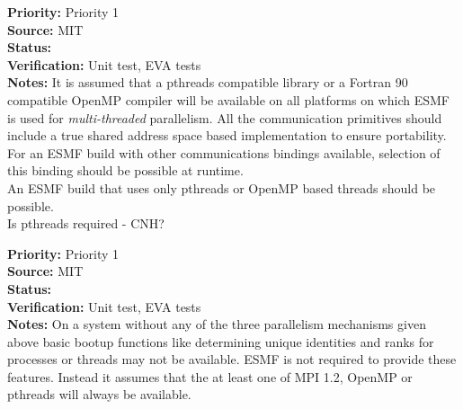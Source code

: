 \begin{reqlist}
{\bf Priority:} Priority 1 \\
{\bf Source:}  MIT \\
{\bf Status:}  \\
{\bf Verification:} Unit test, EVA tests \\
{\bf Notes:}  It is assumed that a pthreads compatible library
or a Fortran 90 compatible OpenMP compiler
will be available on all platforms on which ESMF is used
for {\it multi-threaded} parallelism. All the {\bf \shortname}
communication primitives should include a true shared address space based
implementation to ensure portability. \\
For an ESMF build with other communications bindings available,
selection of this binding should be possible at runtime.\\
An ESMF build that uses only pthreads or OpenMP based threads should be possible.\\
Is pthreads required - CNH?
\end{reqlist}

\begin{reqlist}
{\bf Priority:} Priority 1 \\
{\bf Source:}  MIT \\
{\bf Status:}  \\
{\bf Verification:} Unit test, EVA tests \\
{\bf Notes:} On a system without any of the three parallelism
mechanisms given above basic bootup functions like determining
unique identities and ranks for processes or threads may not be available.
ESMF is not required to provide these features. Instead it assumes that
the at least one of MPI 1.2, OpenMP or pthreads will always be available.
\end{reqlist}

